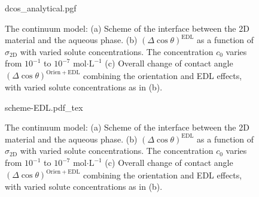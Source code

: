\begin{figure}[!htbp]
  \centering
  {dcos_analytical.pgf}
\caption{\label{fig:wet-res-EDL}  The continuum model: (a) Scheme of the
  interface between the 2D material and the aqueous phase. (b)
  \((\Delta\cos\theta)^{\mathrm{EDL}}\) as a function of
  \(\sigma_{\mathrm{2D}}\) with varied solute concentrations. The
  concentration \(c_{0}\) varies from \(10^{-1}\) to \(10^{-7}\)
  mol\(\cdot\mathrm{L}^{-1}\) (c) Overall change of contact angle
  \((\Delta \cos \theta)^{\mathrm{Orien+EDL}}\) combining the
  orientation and EDL effects, with varied solute concentrations as in
  (b).}
\end{figure}

\begin{figure}[!htbp]
  \centering
  {scheme-EDL.pdf_tex}
\caption{\label{fig:wet-res-EDL}  The continuum model: (a) Scheme of the
  interface between the 2D material and the aqueous phase. (b)
  \((\Delta\cos\theta)^{\mathrm{EDL}}\) as a function of
  \(\sigma_{\mathrm{2D}}\) with varied solute concentrations. The
  concentration \(c_{0}\) varies from \(10^{-1}\) to \(10^{-7}\)
  mol\(\cdot\mathrm{L}^{-1}\) (c) Overall change of contact angle
  \((\Delta \cos \theta)^{\mathrm{Orien+EDL}}\) combining the
  orientation and EDL effects, with varied solute concentrations as in
  (b).}
\end{figure}


